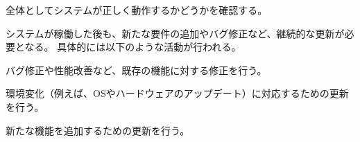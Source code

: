 全体としてシステムが正しく動作するかどうかを確認する。




システムが稼働した後も、新たな要件の追加やバグ修正など、継続的な更新が必要となる。
具体的には以下のような活動が行われる。



バグ修正や性能改善など、既存の機能に対する修正を行う。



環境変化（例えば、OSやハードウェアのアップデート）に対応するための更新を行う。



新たな機能を追加するための更新を行う。




\begin{appendices}

\end{appendices}
